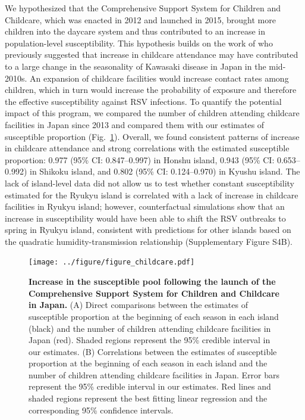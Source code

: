 \documentclass[12pt]{article}
\newcommand{\fref}[1]{Fig.~\ref{fig:#1}}
\begin{document}
We hypothesized that the Comprehensive Support System for Children and Childcare, which was enacted in 2012 and launched in 2015, brought more children into the daycare system and thus contributed to an increase in population-level susceptibility.
This hypothesis builds on the work of \cite{dehaan2024age} who previously suggested that increase in childcare attendance may have contributed to a large change in the seasonality of Kawasaki disease in Japan in the mid-2010s.
An expansion of childcare facilities would increase contact rates among children, which in turn would increase the probability of exposure and therefore the effective susceptibility against RSV infections.
To quantify the potential impact of this program, we compared the number of children attending childcare facilities in Japan since 2013 and compared them with our estimates of susceptible proportion (\fref{fig4}).
Overall, we found consistent patterns of increase in childcare attendance and strong correlations with the estimated susceptible proportion: 0.977 (95\% CI: 0.847--0.997) in Honshu island, 0.943 (95\% CI: 0.653--0.992) in Shikoku island, and 0.802 (95\% CI: 0.124--0.970) in Kyushu island.
The lack of island-level data did not allow us to test whether constant susceptibility estimated for the Ryukyu island is correlated with a lack of increase in childcare facilities in Ryukyu island;
however, counterfactual simulations show that an increase in susceptibility would have been able to shift the RSV outbreaks to spring in Ryukyu island, consistent with predictions for other islands based on the quadratic humidity-transmission relationship (Supplementary Figure S4B).

\begin{figure}[!th]
\texttt{[image: ../figure/figure\_childcare.pdf]}
\caption{
\textbf{Increase in the susceptible pool following the launch of the Comprehensive Support System for Children and Childcare in Japan.}
(A) Direct comparisons between the estimates of susceptible proportion at the beginning of each season in each island (black) and the number of children attending childcare facilities in Japan (red).
Shaded regions represent the 95\% credible interval in our estimates.
(B) Correlations between the estimates of susceptible proportion at the beginning of each season in each island and the number of children attending childcare facilities in Japan.
Error bars represent  the 95\% credible interval in our estimates.
Red lines and shaded regions represent the best fitting linear regression and the corresponding 95\% confidence intervals.
}
\label{fig:fig4}
\end{figure}
\end{document}
